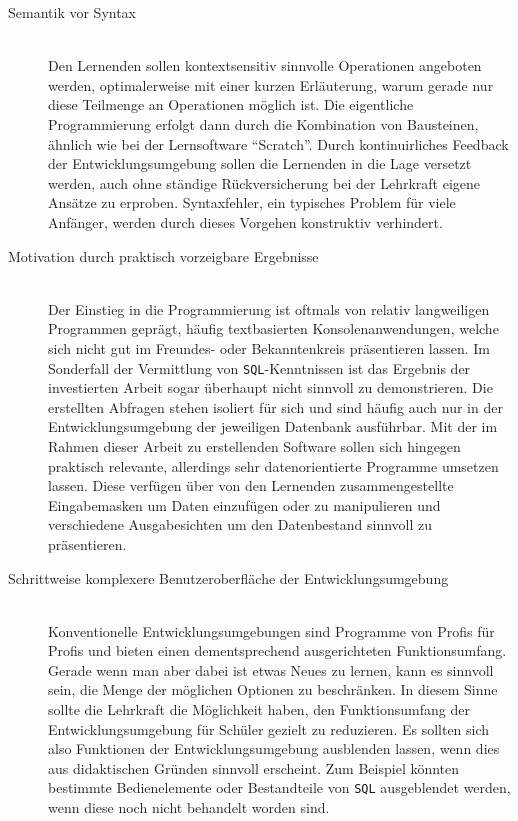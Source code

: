 \begin{description}
\item[Semantik vor Syntax] \hfill\\
  Den Lernenden sollen kontextsensitiv sinnvolle Operationen angeboten werden, optimalerweise mit einer kurzen Erläuterung, warum gerade nur diese Teilmenge an Operationen möglich ist. Die eigentliche Programmierung erfolgt dann durch die Kombination von Bausteinen, ähnlich wie bei der Lernsoftware ``Scratch''. Durch kontinuirliches Feedback der Entwicklungsumgebung sollen die Lernenden in die Lage versetzt werden, auch ohne ständige Rückversicherung bei der Lehrkraft eigene Ansätze zu erproben. Syntaxfehler, ein typisches Problem für viele Anfänger, werden durch dieses Vorgehen konstruktiv verhindert.
\item[Motivation durch praktisch vorzeigbare Ergebnisse] \hfill\\
  Der Einstieg in die Programmierung ist oftmals von relativ langweiligen Programmen geprägt, häufig textbasierten Konsolenanwendungen, welche sich nicht gut im Freundes- oder Bekanntenkreis präsentieren lassen. Im Sonderfall der Vermittlung von \texttt{SQL}-Kenntnissen ist das Ergebnis der investierten Arbeit sogar überhaupt nicht sinnvoll zu demonstrieren. Die erstellten Abfragen stehen isoliert für sich und sind häufig auch nur in der Entwicklungsumgebung der jeweiligen Datenbank ausführbar. Mit der im Rahmen dieser Arbeit zu erstellenden Software sollen sich hingegen praktisch relevante, allerdings sehr datenorientierte Programme umsetzen lassen. Diese verfügen über von den Lernenden zusammengestellte Eingabemasken um Daten einzufügen oder zu manipulieren und verschiedene Ausgabesichten um den Datenbestand sinnvoll zu präsentieren.
\item[Schrittweise komplexere Benutzeroberfläche der Entwicklungsumgebung] \hfill \\
  Konventionelle Entwicklungsumgebungen sind Programme von Profis für Profis und bieten einen dementsprechend ausgerichteten Funktionsumfang. Gerade wenn man aber dabei ist etwas Neues zu lernen, kann es sinnvoll sein, die Menge der möglichen Optionen zu beschränken. In diesem Sinne sollte die Lehrkraft die Möglichkeit haben, den Funktionsumfang der Entwicklungsumgebung für Schüler gezielt zu reduzieren. Es sollten sich also Funktionen der Entwicklungsumgebung ausblenden lassen, wenn dies aus didaktischen Gründen sinnvoll erscheint. Zum Beispiel könnten bestimmte Bedienelemente oder Bestandteile von \texttt{SQL} ausgeblendet werden, wenn diese noch nicht behandelt worden sind.

\end{description}
